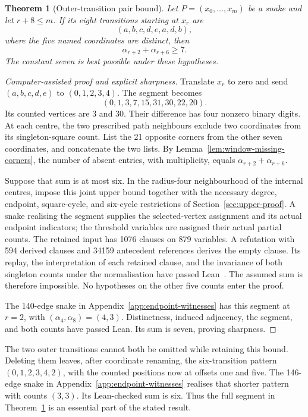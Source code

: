 \documentclass[11pt,a4paper]{article}
\newtheorem{theorem}{Theorem}[section]
\theoremstyle{definition}
\theoremstyle{remark}
\begin{document}
\begin{theorem}[Outer-transition pair bound]\label{thm:outer-pair}
Let $P=(x_0,\ldots,x_m)$ be a snake and let $r+8\le m$. If its eight transitions starting at $x_r$ are
\[
(a,b,c,d,e,a,d,b),
\]
where the five named coordinates are distinct, then
\[
\alpha_{r+2}+\alpha_{r+6}\ge7.
\]
The constant seven is best possible under these hypotheses.
\end{theorem}
\begin{proof}[Computer-assisted proof and explicit sharpness]
Translate $x_r$ to zero and send $(a,b,c,d,e)$ to $(0,1,2,3,4)$. The segment becomes
\[
(0,1,3,7,15,31,30,22,20).
\]
Its counted vertices are 3 and 30. Their difference has four nonzero binary digits. At each centre, the two prescribed path neighbours exclude two coordinates from its singleton-square count. List the 21 opposite corners from the other seven coordinates, and concatenate the two lists. By Lemma~\ref{lem:window-missing-corners}, the number of absent entries, with multiplicity, equals $\alpha_{r+2}+\alpha_{r+6}$.

Suppose that sum is at most six. In the radius-four neighbourhood of the internal centres, impose this joint upper bound together with the necessary degree, endpoint, square-cycle, and six-cycle restrictions of Section~\ref{sec:upper-proof}. A snake realising the segment supplies the selected-vertex assignment and its actual endpoint indicators; the threshold variables are assigned their actual partial counts. The retained input has 1076 clauses on 879 variables. A refutation with 594 derived clauses and 34159 antecedent references derives the empty clause. Its replay, the interpretation of each retained clause, and the invariance of both singleton counts under the normalisation have passed Lean~\cite{outerpairarchive}. The assumed sum is therefore impossible. No hypotheses on the other five counts enter the proof.

The 140-edge snake in Appendix~\ref{app:endpoint-witnesses} has this segment at $r=2$, with $(\alpha_4,\alpha_8)=(4,3)$. Distinctness, induced adjacency, the segment, and both counts have passed Lean. Its sum is seven, proving sharpness.
\end{proof}

The two outer transitions cannot both be omitted while retaining this bound. Deleting them leaves, after coordinate renaming, the six-transition pattern $(0,1,2,3,4,2)$, with the counted positions now at offsets one and five. The 146-edge snake in Appendix~\ref{app:endpoint-witnesses} realises that shorter pattern with counts $(3,3)$. Its Lean-checked sum is six. Thus the full segment in Theorem~\ref{thm:outer-pair} is an essential part of the stated result.
\end{document}
